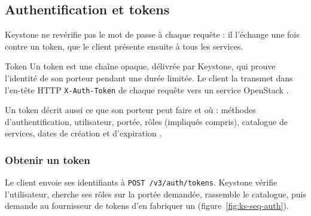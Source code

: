 \subsection{Authentification et tokens}\label{sec:ks-tokens}

Keystone ne revérifie pas le mot de passe à chaque requête : il l'échange une fois contre un \gls{token}, que le client présente
ensuite à tous les services.

\begin{definition}{Token}
Un token est une chaîne opaque, délivrée par Keystone, qui prouve l'identité de son porteur pendant
une durée limitée. Le client la transmet dans l'en-tête HTTP \texttt{X-Auth-Token} de chaque requête
vers un service OpenStack \parencite{keystone-tokens}.
\end{definition}

Un token décrit aussi ce que son porteur peut faire et où : méthodes d'authentification, utilisateur, portée, rôles (impliqués
compris), catalogue de services, dates de création et d'expiration \parencite{api-identity}.

\subsubsection{Obtenir un token}\label{sec:ks-obtenir}

Le client envoie ses identifiants à \texttt{POST /v3/auth/tokens}. Keystone vérifie l'utilisateur,
cherche ses rôles sur la portée demandée, rassemble le catalogue, puis demande au fournisseur de
tokens d'en fabriquer un (figure~\ref{fig:ks-seq-auth}).

